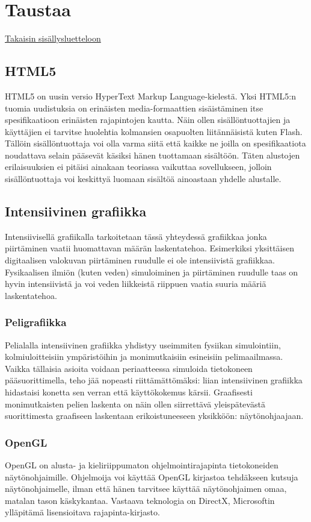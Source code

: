 \section{Taustaa}
\label{sec:taustaa}
\hyperlink{index}{Takaisin sisällysluetteloon}

\subsection{HTML5}
HTML5 on uusin versio HyperText Markup Language-kielestä. Yksi HTML5:n tuomia uudistuksia on erinäisten media-formaattien sisäistäminen itse spesifikaatioon erinäisten rajapintojen kautta\cite{html5diff}. Näin ollen sisällöntuottajien ja käyttäjien ei tarvitse huolehtia kolmansien osapuolten liitännäisistä kuten Flash. Tällöin sisällöntuottaja voi olla varma siitä että kaikke ne joilla on spesifikaatiota noudattava selain pääsevät käsiksi hänen tuottamaan sisältöön. Täten alustojen erilaisuuksien ei pitäisi ainakaan teoriassa vaikuttaa sovellukseen, jolloin sisällöntuottaja voi keskittyä luomaan sisältöä ainoastaan yhdelle alustalle.

\subsection{Intensiivinen grafiikka}
Intensiivisellä grafiikalla tarkoitetaan tässä yhteydessä grafiikkaa jonka piirtäminen vaatii huomattavan määrän laskentatehoa. Esimerkiksi yksittäisen digitaalisen valokuvan piirtäminen ruudulle ei ole intensiivistä grafiikkaa. Fysikaalisen ilmiön (kuten veden) simuloiminen ja piirtäminen ruudulle taas on hyvin intensiivistä ja voi veden liikkeistä riippuen vaatia suuria määriä laskentatehoa.

\subsubsection{Peligrafiikka}
Pelialalla intensiivinen grafiikka yhdistyy useimmiten fysiikan simulointiin, kolmiuloitteisiin ympäristöihin ja monimutkaisiin esineisiin pelimaailmassa. Vaikka tällaisia asioita voidaan periaatteessa simuloida tietokoneen pääsuorittimella, teho jää nopeasti riittämättömäksi: liian intensiivinen grafiikka hidastaisi konetta sen verran että käyttökokemus kärsii. Graafisesti monimutkaisten pelien laskenta on näin ollen siirrettävä yleispätevästä suorittimesta graafiseen laskentaan erikoistuneeseen yksikköön: näytönohjaajaan. 

\subsubsection{OpenGL}
OpenGL on alusta- ja kieliriippumaton ohjelmointirajapinta tietokoneiden näytönohjaimille\cite{opengl4}. Ohjelmoija voi käyttää OpenGL kirjastoa tehdäkseen kutsuja näytönohjaimelle, ilman että hänen tarvitsee käyttää näytönohjaimen omaa, matalan tason käskykantaa. Vastaava teknologia on DirectX\cite{directx}, Microsoftin ylläpitämä lisensioitava rajapinta-kirjasto.

